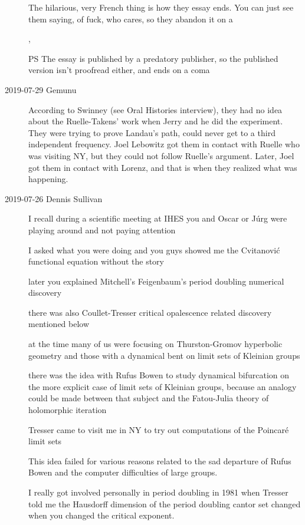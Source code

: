 \begin{description}
The hilarious, very French thing is how they essay ends. You can just see
them saying, of fuck, who cares, so they abandon it on a %

,

\medskip

PS The essay is published by a predatory publisher, so the published
version isn't proofread either, and ends on a coma

\item[2019-07-29 Gemunu]
According to  {Swinney}
(see Oral Histories interview), they had no idea about the Ruelle-Takens'
work when Jerry and he did the experiment. They were trying to prove
Landau's path, could never get to a third independent frequency. Joel
Lebowitz got them in contact with Ruelle who was visiting NY, but they
could not follow Ruelle's argument. Later, Joel got them in contact with
Lorenz, and that is when they realized what was happening.

\item[2019-07-26 Dennis Sullivan] %
I recall during a scientific meeting at IHES you and Oscar or J{\'u}rg
were playing around and not paying attention

I asked what you were doing and you guys showed me the Cvitanovi{\'c} functional
equation without the story

later you explained Mitchell's Feigenbaum's period doubling
numerical discovery

there was also Coullet-Tresser critical opalescence related discovery
mentioned below

at the time  many of us were focusing on Thurston-Gromov hyperbolic
geometry and  those with a dynamical bent on limit sets of Kleinian
groups

there was the idea with Rufus Bowen to study dynamical bifurcation on the
more explicit case of limit sets of Kleinian groups,
because an analogy could be made between that subject and the Fatou-Julia
theory of holomorphic iteration

Tresser came to visit me in NY to try out computations of the Poincar\'e
limit sets

This idea failed for various reasons related to the sad departure of
Rufus Bowen and the computer difficulties of large groups.

I really got involved personally in period doubling in 1981 when Tresser
told me the Hausdorff dimension  of the period doubling cantor set changed
when you changed the critical exponent.


\end{description}
